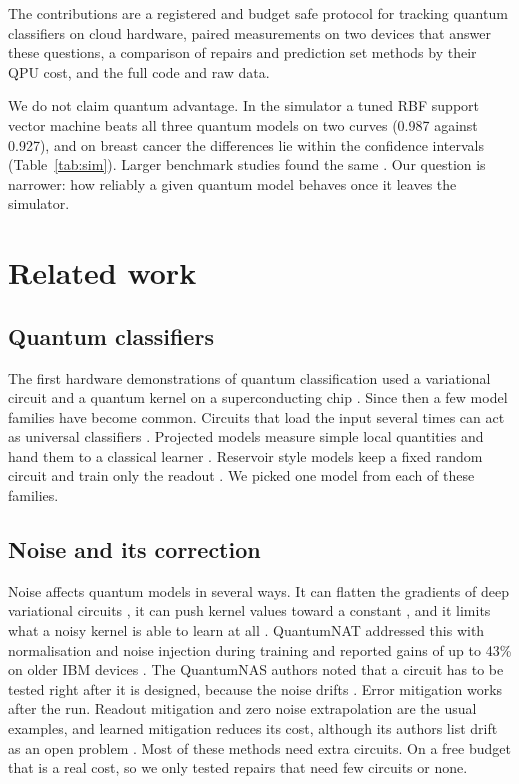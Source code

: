 \documentclass[10pt,conference]{IEEEtran}
\begin{document}
The contributions are a registered and budget safe protocol for tracking quantum
classifiers on cloud hardware, paired measurements on two devices that answer these questions, a
comparison of repairs and prediction set methods by their QPU cost, and the full code and raw data.

We do not claim quantum advantage. In the simulator a tuned RBF support vector
machine beats all three quantum models on two curves (0.987 against 0.927), and on breast cancer
the differences lie within the confidence intervals (Table~\ref{tab:sim}). Larger benchmark studies found the same
\cite{bowles2024benchmarking,schuld2022advantage}. Our question is narrower: how reliably a given quantum model behaves once it leaves the
simulator.

\section{Related work}

\subsection{Quantum classifiers}
The first hardware demonstrations of quantum classification used a variational circuit and a
quantum kernel on a superconducting chip \cite{havlicek2019supervised}. Since then a few model
families have become common. Circuits that load the input several times can act as universal
classifiers \cite{perezsalinas2020reuploading}. Projected models measure simple local quantities
and hand them to a classical learner \cite{huang2021power}. Reservoir style models keep a fixed
random circuit and train only the readout \cite{yasuda2023qrc}. We picked one model from each of
these families.

\subsection{Noise and its correction}
Noise affects quantum models in several ways. It can flatten the gradients of deep variational
circuits \cite{wang2021nibp}, it can push kernel values toward a constant
\cite{thanasilp2024concentration}, and it limits what a noisy kernel is able to learn at all
\cite{heyraud2022noisykernels}. QuantumNAT addressed this with normalisation and noise injection
during training and reported gains of up to 43\% on older IBM devices \cite{wang2022quantumnat}.
The QuantumNAS authors noted that a circuit has to be tested right after it is
designed, because the noise drifts \cite{wang2022quantumnas}. Error mitigation works after the run.
Readout mitigation \cite{nation2021m3} and zero noise extrapolation \cite{temme2017zne} are the
usual examples, and learned mitigation reduces its cost, although its authors list drift as
an open problem \cite{liao2024mlqem}. Most of these methods need extra circuits. On a free budget
that is a real cost, so we only tested repairs that need few circuits or none.
\end{document}
